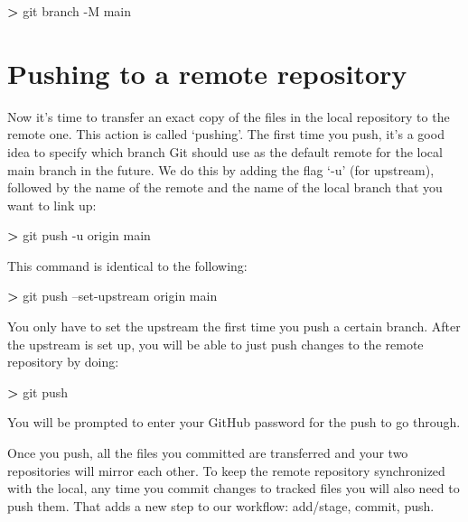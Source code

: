 \documentclass[
]{book}
\newenvironment{Shaded}{\begin{snugshade}}{\end{snugshade}}
\newcommand{\FunctionTok}[1]{\textcolor[rgb]{0.00,0.00,0.00}{#1}}
\newcommand{\NormalTok}[1]{#1}
\newcommand{\OperatorTok}[1]{\textcolor[rgb]{0.81,0.36,0.00}{\textbf{#1}}}
\begin{document}
\begin{Shaded}
\begin{Highlighting}[]
\OperatorTok{>} \FunctionTok{git}\NormalTok{ branch -M main}
\end{Highlighting}
\end{Shaded}

\hypertarget{pushing-to-a-remote-repository}{%
\section{Pushing to a remote repository}\label{pushing-to-a-remote-repository}}

Now it's time to transfer an exact copy of the files in the local repository to the remote one. This action is called `pushing'. The first time you push, it's a good idea to specify which branch Git should use as the default remote for the local main branch in the future. We do this by adding the flag `-u' (for upstream), followed by the name of the remote and the name of the local branch that you want to link up:

\begin{Shaded}
\begin{Highlighting}[]
\OperatorTok{>} \FunctionTok{git}\NormalTok{ push -u origin main}
\end{Highlighting}
\end{Shaded}

This command is identical to the following:

\begin{Shaded}
\begin{Highlighting}[]
\OperatorTok{>} \FunctionTok{git}\NormalTok{ push --set-upstream origin main}
\end{Highlighting}
\end{Shaded}

You only have to set the upstream the first time you push a certain branch. After the upstream is set up, you will be able to just push changes to the remote repository by doing:

\begin{Shaded}
\begin{Highlighting}[]
\OperatorTok{>} \FunctionTok{git}\NormalTok{ push}
\end{Highlighting}
\end{Shaded}

You will be prompted to enter your GitHub password for the push to go through.

Once you push, all the files you committed are transferred and your two repositories will mirror each other. To keep the remote repository synchronized with the local, any time you commit changes to tracked files you will also need to push them. That adds a new step to our workflow: add/stage, commit, push.
\end{document}
